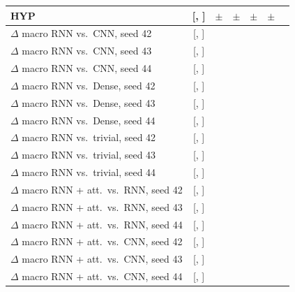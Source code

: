 \begin{tabular}{lcccccc}
HYP & \rnnFinalFirstTestAurocHYP{} [\rnnFinalFirstTestAurocHYPLo{}, \rnnFinalFirstTestAurocHYPHi{}] & \rnnFinalTestAurocHYPMean{} $\pm$ \rnnFinalTestAurocHYPSd{} & \rnnAttnfinalTestAurocHYPMean{} $\pm$ \rnnAttnfinalTestAurocHYPSd{} & \cnnFinalTestAurocHYPMean{} $\pm$ \cnnFinalTestAurocHYPSd{} & \denseFinalTestAurocHYPMean{} $\pm$ \denseFinalTestAurocHYPSd{} & \trivialTestAurocHYP{} \\
\midrule
$\Delta$ macro RNN vs.\ CNN, seed 42 & \rnnDiffCnnSFourTwo{} [\rnnDiffCnnLoSFourTwo{}, \rnnDiffCnnHiSFourTwo{}] & & & & & \\
$\Delta$ macro RNN vs.\ CNN, seed 43 & \rnnDiffCnnSFourThree{} [\rnnDiffCnnLoSFourThree{}, \rnnDiffCnnHiSFourThree{}] & & & & & \\
$\Delta$ macro RNN vs.\ CNN, seed 44 & \rnnDiffCnnSFourFour{} [\rnnDiffCnnLoSFourFour{}, \rnnDiffCnnHiSFourFour{}] & & & & & \\
$\Delta$ macro RNN vs.\ Dense, seed 42 & \rnnDiffDenseSFourTwo{} [\rnnDiffDenseLoSFourTwo{}, \rnnDiffDenseHiSFourTwo{}] & & & & & \\
$\Delta$ macro RNN vs.\ Dense, seed 43 & \rnnDiffDenseSFourThree{} [\rnnDiffDenseLoSFourThree{}, \rnnDiffDenseHiSFourThree{}] & & & & & \\
$\Delta$ macro RNN vs.\ Dense, seed 44 & \rnnDiffDenseSFourFour{} [\rnnDiffDenseLoSFourFour{}, \rnnDiffDenseHiSFourFour{}] & & & & & \\
$\Delta$ macro RNN vs.\ trivial, seed 42 & \rnnDiffTrivialSFourTwo{} [\rnnDiffTrivialLoSFourTwo{}, \rnnDiffTrivialHiSFourTwo{}] & & & & & \\
$\Delta$ macro RNN vs.\ trivial, seed 43 & \rnnDiffTrivialSFourThree{} [\rnnDiffTrivialLoSFourThree{}, \rnnDiffTrivialHiSFourThree{}] & & & & & \\
$\Delta$ macro RNN vs.\ trivial, seed 44 & \rnnDiffTrivialSFourFour{} [\rnnDiffTrivialLoSFourFour{}, \rnnDiffTrivialHiSFourFour{}] & & & & & \\
$\Delta$ macro RNN + att.\ vs.\ RNN, seed 42 & \rnnDiffAttnFinalSFourTwo{} [\rnnDiffAttnFinalLoSFourTwo{}, \rnnDiffAttnFinalHiSFourTwo{}] & & & & & \\
$\Delta$ macro RNN + att.\ vs.\ RNN, seed 43 & \rnnDiffAttnFinalSFourThree{} [\rnnDiffAttnFinalLoSFourThree{}, \rnnDiffAttnFinalHiSFourThree{}] & & & & & \\
$\Delta$ macro RNN + att.\ vs.\ RNN, seed 44 & \rnnDiffAttnFinalSFourFour{} [\rnnDiffAttnFinalLoSFourFour{}, \rnnDiffAttnFinalHiSFourFour{}] & & & & & \\
$\Delta$ macro RNN + att.\ vs.\ CNN, seed 42 & \rnnDiffAttnCnnSFourTwo{} [\rnnDiffAttnCnnLoSFourTwo{}, \rnnDiffAttnCnnHiSFourTwo{}] & & & & & \\
$\Delta$ macro RNN + att.\ vs.\ CNN, seed 43 & \rnnDiffAttnCnnSFourThree{} [\rnnDiffAttnCnnLoSFourThree{}, \rnnDiffAttnCnnHiSFourThree{}] & & & & & \\
$\Delta$ macro RNN + att.\ vs.\ CNN, seed 44 & \rnnDiffAttnCnnSFourFour{} [\rnnDiffAttnCnnLoSFourFour{}, \rnnDiffAttnCnnHiSFourFour{}] & & & & & \\
\bottomrule
\end{tabular}
